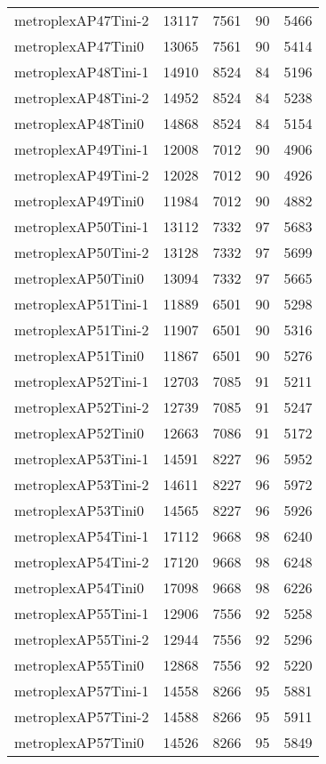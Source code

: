 \begin{longtable}{lrrrr}
metroplexAP47Tini-2 & 13117 & 7561 & 90 & 5466 \\
metroplexAP47Tini0 & 13065 & 7561 & 90 & 5414 \\
metroplexAP48Tini-1 & 14910 & 8524 & 84 & 5196 \\
metroplexAP48Tini-2 & 14952 & 8524 & 84 & 5238 \\
metroplexAP48Tini0 & 14868 & 8524 & 84 & 5154 \\
metroplexAP49Tini-1 & 12008 & 7012 & 90 & 4906 \\
metroplexAP49Tini-2 & 12028 & 7012 & 90 & 4926 \\
metroplexAP49Tini0 & 11984 & 7012 & 90 & 4882 \\
metroplexAP50Tini-1 & 13112 & 7332 & 97 & 5683 \\
metroplexAP50Tini-2 & 13128 & 7332 & 97 & 5699 \\
metroplexAP50Tini0 & 13094 & 7332 & 97 & 5665 \\
metroplexAP51Tini-1 & 11889 & 6501 & 90 & 5298 \\
metroplexAP51Tini-2 & 11907 & 6501 & 90 & 5316 \\
metroplexAP51Tini0 & 11867 & 6501 & 90 & 5276 \\
metroplexAP52Tini-1 & 12703 & 7085 & 91 & 5211 \\
metroplexAP52Tini-2 & 12739 & 7085 & 91 & 5247 \\
metroplexAP52Tini0 & 12663 & 7086 & 91 & 5172 \\
metroplexAP53Tini-1 & 14591 & 8227 & 96 & 5952 \\
metroplexAP53Tini-2 & 14611 & 8227 & 96 & 5972 \\
metroplexAP53Tini0 & 14565 & 8227 & 96 & 5926 \\
metroplexAP54Tini-1 & 17112 & 9668 & 98 & 6240 \\
metroplexAP54Tini-2 & 17120 & 9668 & 98 & 6248 \\
metroplexAP54Tini0 & 17098 & 9668 & 98 & 6226 \\
metroplexAP55Tini-1 & 12906 & 7556 & 92 & 5258 \\
metroplexAP55Tini-2 & 12944 & 7556 & 92 & 5296 \\
metroplexAP55Tini0 & 12868 & 7556 & 92 & 5220 \\
metroplexAP57Tini-1 & 14558 & 8266 & 95 & 5881 \\
metroplexAP57Tini-2 & 14588 & 8266 & 95 & 5911 \\
metroplexAP57Tini0 & 14526 & 8266 & 95 & 5849 \\

\end{longtable}
